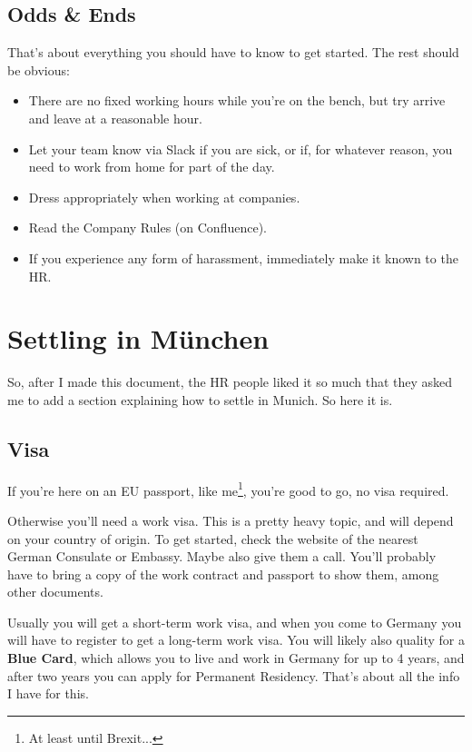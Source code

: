 \documentclass[11pt]{report}
\begin{document}
\section{Odds \& Ends}
That's about everything you should have to know to get started. The rest should be obvious:
\begin{itemize}
\item There are no fixed working hours while you're on the bench, but try arrive and leave at a reasonable hour.
\item Let your team know via Slack if you are sick, or if, for whatever reason, you need to work from home for part of the day.
\item Dress appropriately when working at companies.
\item Read the Company Rules (on Confluence).
\item If you experience any form of harassment, immediately make it known to the HR.
\end{itemize}

\chapter{Settling in M\"unchen}
So, after I made this document, the HR people liked it so much that they asked me to add a section explaining how to settle in Munich. So here it is.

\section{Visa}
If you're here on an EU passport, like me\footnote{At least until Brexit...}, you're good to go, no visa required.

Otherwise you'll need a work visa. This is a pretty heavy topic, and will depend on your country of origin. To get started, check the website of the nearest German Consulate or Embassy. Maybe also give them a call. You'll probably have to bring a copy of the work contract and passport to show them, among other documents.

Usually you will get a short-term work visa, and when you come to Germany you will have to register to get a long-term work visa. You will likely also quality for a \textbf{Blue Card}, which allows you to live and work in Germany for up to 4 years, and after two years you can apply for Permanent Residency. That's about all the info I have for this.
\end{document}
